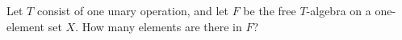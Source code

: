 Let $T$ consist of one unary operation, and let $F$ be the free $T$-algebra on a one-element set $X$. How many elements are there in $F$?
